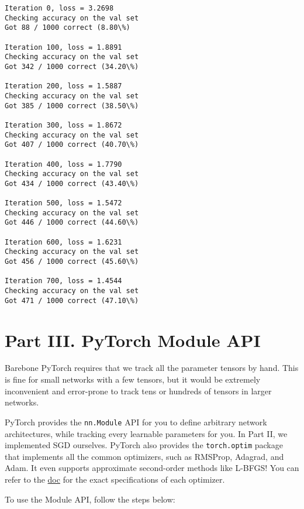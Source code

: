 \documentclass[11pt]{article}
\begin{document}
    \begin{Verbatim}[commandchars=\\\{\}]
Iteration 0, loss = 3.2698
Checking accuracy on the val set
Got 88 / 1000 correct (8.80\%)

Iteration 100, loss = 1.8891
Checking accuracy on the val set
Got 342 / 1000 correct (34.20\%)

Iteration 200, loss = 1.5887
Checking accuracy on the val set
Got 385 / 1000 correct (38.50\%)

Iteration 300, loss = 1.8672
Checking accuracy on the val set
Got 407 / 1000 correct (40.70\%)

Iteration 400, loss = 1.7790
Checking accuracy on the val set
Got 434 / 1000 correct (43.40\%)

Iteration 500, loss = 1.5472
Checking accuracy on the val set
Got 446 / 1000 correct (44.60\%)

Iteration 600, loss = 1.6231
Checking accuracy on the val set
Got 456 / 1000 correct (45.60\%)

Iteration 700, loss = 1.4544
Checking accuracy on the val set
Got 471 / 1000 correct (47.10\%)

    \end{Verbatim}

    \hypertarget{part-iii.-pytorch-module-api}{%
\section{Part III. PyTorch Module
API}\label{part-iii.-pytorch-module-api}}

Barebone PyTorch requires that we track all the parameter tensors by
hand. This is fine for small networks with a few tensors, but it would
be extremely inconvenient and error-prone to track tens or hundreds of
tensors in larger networks.

PyTorch provides the \texttt{nn.Module} API for you to define arbitrary
network architectures, while tracking every learnable parameters for
you. In Part II, we implemented SGD ourselves. PyTorch also provides the
\texttt{torch.optim} package that implements all the common optimizers,
such as RMSProp, Adagrad, and Adam. It even supports approximate
second-order methods like L-BFGS! You can refer to the
\href{http://pytorch.org/docs/master/optim.html}{doc} for the exact
specifications of each optimizer.

To use the Module API, follow the steps below:
\end{document}
